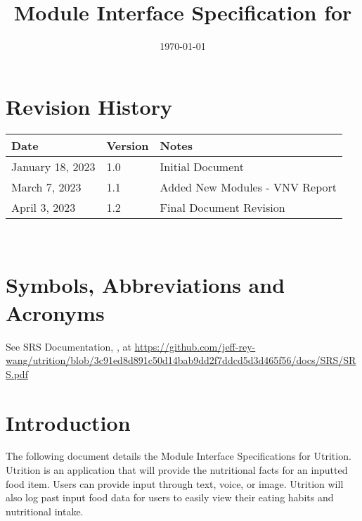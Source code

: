 \documentclass[12pt, titlepage]{article}
\begin{document}
\title{Module Interface Specification for \progname{}}

\author{\authname}

\date{\today}

\maketitle


\section{Revision History}

\begin{tabularx}{\textwidth}{p{3cm}p{2cm}X}
\toprule {\bf Date} & {\bf Version} & {\bf Notes}\\
\midrule
January 18, 2023 & 1.0 & Initial Document\\
March 7, 2023 & 1.1 & Added New Modules - VNV Report\\
April 3, 2023 & 1.2 & Final Document Revision\\
\bottomrule
\end{tabularx}

~\newpage

\section{Symbols, Abbreviations and Acronyms}

See SRS Documentation, \cite{SRS}, at \url{https://github.com/jeff-rey-wang/utrition/blob/3c91ed8d891c50d14bab9dd2f7ddcd5d3d465f56/docs/SRS/SRS.pdf}


\newpage

\tableofcontents

\newpage


\section{Introduction}

The following document details the Module Interface Specifications for Utrition. Utrition is an application that will provide the nutritional facts for an inputted food item. Users can provide input through text, voice, or image. Utrition will also log past input food data for users to easily view their eating habits and nutritional intake.
\end{document}
